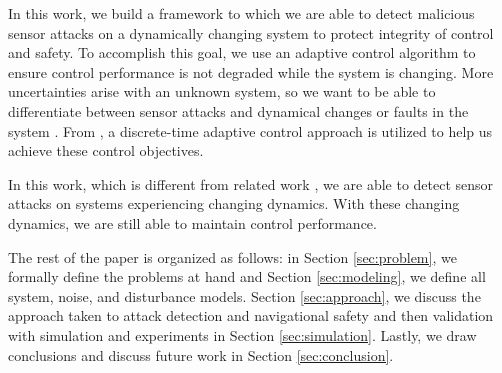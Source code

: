 
In this work, we build a framework to which we are able to detect malicious sensor attacks on a dynamically changing system to protect integrity of control and safety. To accomplish this goal, we use an adaptive control algorithm to ensure control performance is not degraded while the system is changing. More uncertainties arise with an unknown system, so we want to be able to differentiate between sensor attacks and dynamical changes or faults in the system .  From \cite{tao2003adaptive,Goodwin1643720}, a  discrete-time adaptive control approach is utilized to help us achieve these control objectives.

In this work, which is different from related work , we are able to detect sensor attacks on systems experiencing changing dynamics. With these changing dynamics, we are still able to maintain control performance.

The rest of the paper is organized as follows: in Section \ref{sec:problem}, we formally define the problems at hand and Section \ref{sec:modeling}, we define all system, noise, and disturbance models. Section \ref{sec:approach}, we discuss the approach taken to attack detection and navigational safety and then validation with simulation and experiments in Section \ref{sec:simulation}. Lastly, we draw conclusions and discuss future work in Section \ref{sec:conclusion}.


